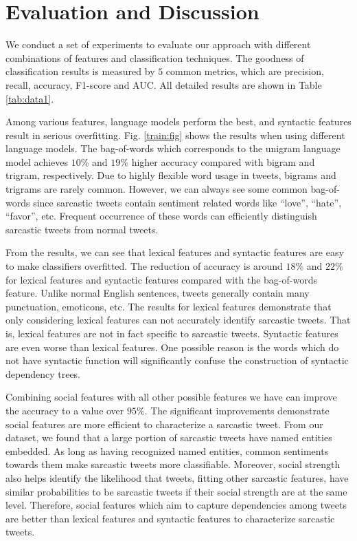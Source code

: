\section{Evaluation and Discussion}
\label{sec:evaluation}

We conduct a set of experiments to evaluate our approach with different combinations of features and classification techniques. The goodness of classification results is measured by $5$ common metrics, which are precision, recall, accuracy, F1-score and AUC. All detailed results are shown in Table \ref{tab:data1}.

Among various features, language models perform the best, and syntactic features result in serious overfitting. Fig. \ref{train:fig} shows the results when using different language models. The bag-of-words which corresponds to the unigram language model achieves $10\%$ and $19\%$ higher accuracy compared with bigram and trigram, respectively. Due to highly flexible word usage in tweets, bigrams and trigrams are rarely common. However, we can always see some common bag-of-words since sarcastic tweets contain sentiment related words like ``love'', ``hate'', ``favor'', etc. Frequent occurrence of these words can efficiently distinguish sarcastic tweets from normal tweets.

From the results, we can see that lexical features and syntactic features are easy to make classifiers overfitted. The reduction of accuracy is around $18\%$ and $22\%$ for lexical features and syntactic features compared with the bag-of-words feature. Unlike normal English sentences, tweets generally contain many punctuation, emoticons, etc. The results for lexical features demonstrate that only considering lexical features can not accurately identify sarcastic tweets. That is, lexical features are not in fact specific to sarcastic tweets. Syntactic features are even worse than lexical features. One possible reason is the words which do not have syntactic function will significantly confuse the construction of syntactic dependency trees.

Combining social features with all other possible features we have can improve the accuracy to a value over $95\%$. The significant improvements demonstrate social features are more efficient to characterize a sarcastic tweet. From our dataset, we found that a large portion of sarcastic tweets have named entities embedded. As long as having recognized named entities, common sentiments towards them make sarcastic tweets more classifiable. Moreover, social strength also helps identify the likelihood that tweets, fitting other sarcastic features, have similar probabilities to be sarcastic tweets if their social strength are at the same level. Therefore, social features which aim to capture dependencies among tweets are better than lexical features and syntactic features to characterize sarcastic tweets.

